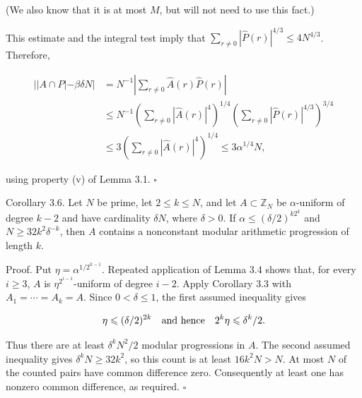 \documentclass[10pt]{article}
\begin{document}
(We also know that it is at most $M$, but will not need to use this fact.)

This estimate and the integral test imply that $\sum_{r \neq 0}|\hat{P}(r)|^{4 / 3} \leqslant 4N^{4 / 3}$. Therefore,

$$
\begin{aligned}
||A \cap P|-\beta \delta N| & =N^{-1}\left|\sum_{r \neq 0} \hat{A}(r) \hat{P}(r)\right| \\
& \leqslant N^{-1}\left(\sum_{r \neq 0}|\hat{A}(r)|^{4}\right)^{1 / 4}\left(\sum_{r \neq 0}|\hat{P}(r)|^{4 / 3}\right)^{3 / 4} \\
& \leqslant 3\left(\sum_{r \neq 0}|\hat{A}(r)|^{4}\right)^{1 / 4} \leqslant 3\alpha^{1 / 4} N,
\end{aligned}
$$

using property (v) of Lemma 3.1. \(\square\)

Corollary 3.6. Let $N$ be prime, let $2\leqslant k\leqslant N$, and let $A \subset \mathbb{Z}_{N}$ be $\alpha$-uniform of degree $k-2$ and have cardinality $\delta N$, where $\delta>0$. If $\alpha \leqslant(\delta / 2)^{k 2^{k}}$ and $N \geqslant 32 k^{2} \delta^{-k}$, then $A$ contains a nonconstant modular arithmetic progression of length $k$.

Proof. Put $\eta=\alpha^{1/2^{k-1}}$. Repeated application of Lemma 3.4 shows that, for every $i\geqslant3$, $A$ is $\eta^{2^{i-1}}$-uniform of degree $i-2$. Apply Corollary 3.3 with $A_{1}=\cdots=A_{k}=A$. Since $0<\delta\leqslant1$, the first assumed inequality gives

$$
 \eta\leqslant(\delta/2)^{2k}
 \quad\hbox{and hence}\quad
 2^{k}\eta\leqslant\delta^{k}/2.
$$

Thus there are at least $\delta^{k}N^{2}/2$ modular progressions in $A$. The second assumed inequality gives $\delta^{k}N\geqslant32k^{2}$, so this count is at least $16k^{2}N>N$. At most $N$ of the counted pairs have common difference zero. Consequently at least one has nonzero common difference, as required. \(\square\)
\end{document}
